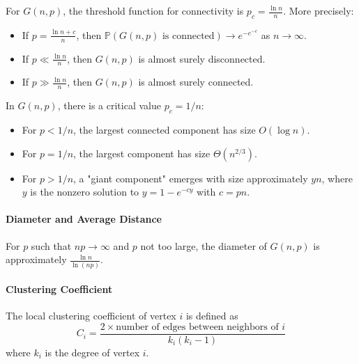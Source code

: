 \begin{theorem}
For $G(n,p)$, the threshold function for connectivity is $p_c = \frac{\ln n}{n}$. More precisely:
\begin{itemize}
\item If $p = \frac{\ln n + c}{n}$, then $\mathbb{P}(G(n,p) \text{ is connected}) \to e^{-e^{-c}}$ as $n \to \infty$.
\item If $p \ll \frac{\ln n}{n}$, then $G(n,p)$ is almost surely disconnected.
\item If $p \gg \frac{\ln n}{n}$, then $G(n,p)$ is almost surely connected.
\end{itemize}
\end{theorem}

\begin{theorem}
In $G(n,p)$, there is a critical value $p_c = 1/n$:
\begin{itemize}
\item For $p < 1/n$, the largest connected component has size $O(\log n)$.
\item For $p = 1/n$, the largest component has size $\Theta(n^{2/3})$.
\item For $p > 1/n$, a "giant component" emerges with size approximately $yn$, where $y$ is the nonzero solution to $y = 1 - e^{-c y}$ with $c = pn$.
\end{itemize}
\end{theorem}

\paragraph{Diameter and Average Distance}
\begin{theorem}[Diameter of $G(n,p)$]
For $p$ such that $np \to \infty$ and $p$ not too large, the diameter of $G(n,p)$ is approximately $\frac{\ln n}{\ln(np)}$.
\end{theorem}

\paragraph{Clustering Coefficient}
\begin{definition}
The local clustering coefficient of vertex $i$ is defined as
\begin{equation}
C_i = \frac{2 \times \text{number of edges between neighbors of } i}{k_i(k_i-1)}
\end{equation}
where $k_i$ is the degree of vertex $i$.
\end{definition}

